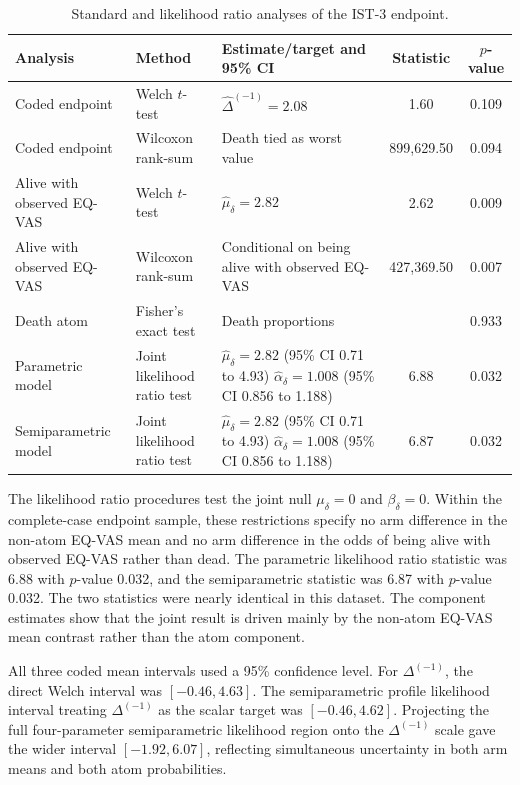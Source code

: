 \documentclass[11pt]{article}
\newcommand{\ApplicationDeltaWelchLower}{-0.46}
\newcommand{\ApplicationDeltaWelchUpper}{4.63}
\newcommand{\ApplicationDeltaProfileLower}{-0.46}
\newcommand{\ApplicationDeltaProfileUpper}{4.62}
\newcommand{\ApplicationDeltaProjectedLower}{-1.92}
\newcommand{\ApplicationDeltaProjectedUpper}{6.07}
\newcommand{\ApplicationLRTP}{0.032}
\newcommand{\ApplicationSPLRTP}{0.032}
\newcommand{\ApplicationLRTStatistic}{6.88}
\newcommand{\ApplicationSPLRTStatistic}{6.87}
\begin{document}
\begin{table}[H]
\centering
\caption{Standard and likelihood ratio analyses of the IST-3 endpoint.}
\label{tab:ist3-frequentist}
\scriptsize
\begin{tabular}{p{}p{}p{}cc}
\toprule
Analysis & Method & Estimate/target and 95\% CI & Statistic & $p$-value
\\
\midrule
Coded endpoint & Welch $t$-test & $\widehat{\Delta}^{(-1)} = 2.08$ & 1.60 & 0.109\\
Coded endpoint & Wilcoxon rank-sum & Death tied as worst value & 899,629.50 & 0.094\\
Alive with observed EQ-VAS & Welch $t$-test & $\widehat{\mu}_\delta = 2.82$ & 2.62 & 0.009\\
Alive with observed EQ-VAS & Wilcoxon rank-sum & Conditional on being alive with observed EQ-VAS & 427,369.50 & 0.007\\
Death atom & Fisher's exact test & Death proportions &  & 0.933\\
Parametric model & Joint likelihood ratio test & \makecell[l]{$\widehat{\mu}_\delta = 2.82$ (95\% CI 0.71 to 4.93)\\$\widehat{\alpha}_\delta = 1.008$ (95\% CI 0.856 to 1.188)} & 6.88 & 0.032\\
Semiparametric model & Joint likelihood ratio test & \makecell[l]{$\widehat{\mu}_\delta = 2.82$ (95\% CI 0.71 to 4.93)\\$\widehat{\alpha}_\delta = 1.008$ (95\% CI 0.856 to 1.188)} & 6.87 & 0.032\\
\bottomrule
\end{tabular}
\end{table}

The likelihood ratio procedures test the joint null $\mu_\delta=0$ and $\beta_\delta=0$. Within the complete-case endpoint sample, these restrictions specify no arm difference in the non-atom EQ-VAS mean and no arm difference in the odds of being alive with observed EQ-VAS rather than dead. The parametric likelihood ratio statistic was \ApplicationLRTStatistic{} with $p$-value \ApplicationLRTP{}, and the semiparametric statistic was \ApplicationSPLRTStatistic{} with $p$-value \ApplicationSPLRTP{}. The two statistics were nearly identical in this dataset. The component estimates show that the joint result is driven mainly by the non-atom EQ-VAS mean contrast rather than the atom component.

All three coded mean intervals used a 95\% confidence level. For $\Delta^{(-1)}$, the direct Welch interval was $[\ApplicationDeltaWelchLower{}, \ApplicationDeltaWelchUpper{}]$. The semiparametric profile likelihood interval treating $\Delta^{(-1)}$ as the scalar target was $[\ApplicationDeltaProfileLower{}, \ApplicationDeltaProfileUpper{}]$. Projecting the full four-parameter semiparametric likelihood region onto the $\Delta^{(-1)}$ scale gave the wider interval $[\ApplicationDeltaProjectedLower{}, \ApplicationDeltaProjectedUpper{}]$, reflecting simultaneous uncertainty in both arm means and both atom probabilities.
\end{document}
